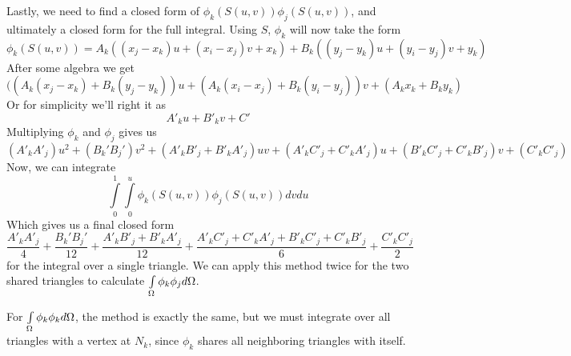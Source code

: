 Lastly, we need to find a closed form of $\phi_k(S(u,v))\phi_j(S(u,v))$, and ultimately a closed form for the full
integral. Using $S$, $\phi_k$ will now take the form
\begin{equation}
\phi_k(S(u,v)) = A_k ((x_j - x_k)u + (x_i - x_j)v + x_k) + B_k((y_j - y_k)u + (y_i - y_j)v + y_k)
\end{equation}
After some algebra we get
\begin{equation}
((A_k(x_j-x_k) + B_k(y_j-y_k))u + (A_k(x_i-x_j) + B_k(y_i-y_j))v + (A_k x_k + B_k y_k)
\end{equation}
Or for simplicity we'll right it as
\begin{equation}
A'_k u + B'_k v + C'
\end{equation}
Multiplying $\phi_k$ and $\phi_j$ gives us
\begin{equation}
(A'_k A'_j)u^2 + (B_k'B_j')v^2 + (A'_k B'_j + B'_k A'_j)uv + (A'_k C'_j + C'_k A'_j)u
+ (B'_kC'_j + C'_kB'_j)v + (C'_k C'_j)
\end{equation}
Now, we can integrate
\begin{equation}
\int\limits_0^1\int\limits_0^u \phi_k(S(u,v)) \phi_j(S(u,v)) dvdu
\end{equation}
Which gives us a final closed form
\begin{equation}
\frac{A'_k A'_j}{4} + \frac{B_k'B_j'}{12} + \frac{A'_k B'_j + B'_k A'_j}{12} +
\frac{A'_k C'_j + C'_k A'_j + B'_kC'_j + C'_kB'_j}{6} + \frac{C'_k C'_j}{2}
\end{equation}
for the integral over a single triangle. We can apply this method twice for the two shared triangles to calculate
$\int\limits_{\Omega} \phi_k \phi_j d\Omega$.

For $\int\limits_{\Omega} \phi_k \phi_k d\Omega$, the method is exactly the same, but we must integrate over all triangles with a
vertex at $N_k$, since $\phi_k$ shares all neighboring triangles with itself.
